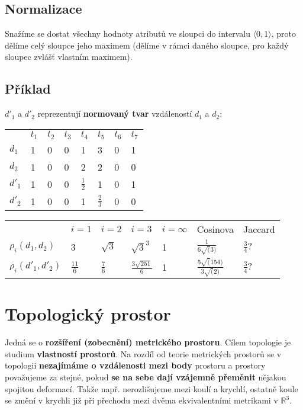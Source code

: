 \subsection{Normalizace}
Snažíme se dostat všechny hodnoty atributů ve sloupci do intervalu $\langle 0, 1\rangle$, proto dělíme celý sloupce jeho maximem (dělíme v rámci daného sloupce, pro každý sloupec zvlášť vlastním maximem).

\subsection*{Příklad}
$d'_1$ a $d'_2$ reprezentují \textbf{normovaný tvar} vzdáleností $d_1$ a $d_2$:
\begin{table}[H]
    \centering
    \begin{tabular}{l|lllllll}
               & $t_1$ & $t_2$ & $t_3$ & $t_4$         & $t_5$         & $t_6$ & $t_7$ \\\hhline
        $d_1$  & 1     & 0     & 0     & 1             & 3             & 0     & 1     \\
        $d_2$  & 1     & 0     & 0     & 2             & 2             & 0     & 0     \\
        $d'_1$ & 1     & 0     & 0     & $\frac{1}{2}$ & 1             & 0     & 1     \\
        $d'_2$ & 1     & 0     & 0     & 1             & $\frac{2}{3}$ & 0     & 0
    \end{tabular}
\end{table}
\begin{table}[H]
    \centering
    \begin{tabular}{l|l|l|l|l|l|l}
                             & $i = 1$        & $i = 2$       & $i = 3$                  & $i = \infty$ & Cosinova                          & Jaccard        \\\hhline
        $\rho_i(d_1, d_2)$   & 3              & $\sqrt{3}$    & $ \sqrt{3}^3 $           & 1            & $\frac{1}{6 \sqrt(3)}$            & $\frac{3}{4}?$ \\
        $\rho_i(d'_1, d'_2)$ & $\frac{11}{6}$ & $\frac{7}{6}$ & $\frac{3 \sqrt{251}}{6}$ & 1            & $\frac{5 \sqrt(154)}{3 \sqrt(2)}$ & $\frac{3}{4}?$
    \end{tabular}
\end{table}

\section{Topologický prostor}
Jedná se o \textbf{rozšíření (zobecnění) metrického prostoru}. Cílem topologie je studium \textbf{vlastností prostorů}. Na rozdíl od teorie metrických prostorů se v topologii \textbf{nezajímáme o vzdálenosti mezi body} prostoru a prostory považujeme za stejné, pokud \textbf{se na sebe dají vzájemně přeměnit} nějakou spojitou deformací. Takže např. nerozlišujeme mezi koulí a krychlí, ostatně koule se změní v krychli již při přechodu mezi dvěma ekvivalentními metrikami v $\mathbb{R}^3$.

